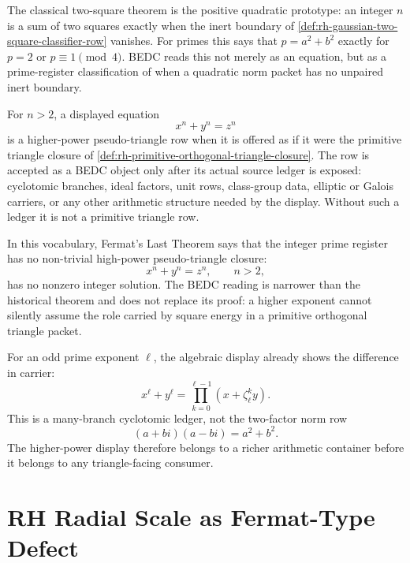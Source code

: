 \begin{principle}
\label{prin:rh-fermat-two-square-quadratic-classifier}
The classical two-square theorem is the positive quadratic prototype:
an integer $n$ is a sum of two squares exactly when the inert boundary
of \autoref{def:rh-gaussian-two-square-classifier-row} vanishes.  For
primes this says that $p=a^2+b^2$ exactly for $p=2$ or
$p\equiv1\pmod4$.  BEDC reads this not merely as an equation, but as a
prime-register classification of when a quadratic norm packet has no
unpaired inert boundary.
\end{principle}

\begin{definition}
\label{def:rh-higher-power-pseudo-triangle-row}
For $n>2$, a displayed equation
$$
x^n+y^n=z^n
$$
is a higher-power pseudo-triangle row when it is offered as if it were the
primitive triangle closure of
\autoref{def:rh-primitive-orthogonal-triangle-closure}.  The row is
accepted as a BEDC object only after its actual source ledger is exposed:
cyclotomic branches, ideal factors, unit rows, class-group data, elliptic
or Galois carriers, or any other arithmetic structure needed by the
display.  Without such a ledger it is not a primitive triangle row.
\end{definition}

\begin{principle}
\label{prin:rh-fermat-last-theorem-high-power-refusal}
In this vocabulary, Fermat's Last Theorem says that the integer prime
register has no non-trivial high-power pseudo-triangle closure:
$$
x^n+y^n=z^n,
\qquad
n>2,
$$
has no nonzero integer solution.  The BEDC reading is narrower than the
historical theorem and does not replace its proof: a higher exponent
cannot silently assume the role carried by square energy in a primitive
orthogonal triangle packet.
\end{principle}

For an odd prime exponent $\ell$, the algebraic display already shows the
difference in carrier:
$$
x^\ell+y^\ell
=
\prod_{k=0}^{\ell-1}(x+\zeta_\ell^k y).
$$
This is a many-branch cyclotomic ledger, not the two-factor norm row
$$
(a+bi)(a-bi)=a^2+b^2.
$$
The higher-power display therefore belongs to a richer arithmetic
container before it belongs to any triangle-facing consumer.

\section{RH Radial Scale as Fermat-Type Defect}
\label{sec:rh-fermat-prototype-rh-radial-scale}


